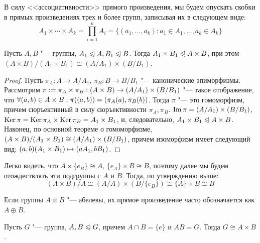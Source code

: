 \begin{note}
	В силу <<ассоциативности>> прямого произведения, мы будем опускать скобки в прямых произведениях трех и более групп, записывая их в следующем виде:
	\[A_1 \times \dotsb \times A_k = \prod_{i = 1}^kA_i = \{(a_1, \dotsc, a_k): a_1 \in A_1, \dotsc, a_k \in A_k\}\]
\end{note}

\begin{proposition}
	Пусть $A, B$ "--- группы, $A_1 \trianglelefteqslant A, B_1 \trianglelefteqslant B$. Тогда $A_1 \times B_1 \trianglelefteqslant A \times B$, при этом $(A \times B) / (A_1 \times B_1) \cong (A / A_1) \times (B / B_1)$.
\end{proposition}

\begin{proof}
	Пусть $\pi_A: A \to A/A_1$, $\pi_B: B \to B/B_1$ "--- канонические эпиморфизмы. Рассмотрим $\pi := \pi_A \times \pi_B: (A \times B) \hm\to (A / A_1) \times (B / B_1)$ "--- такое отображение, что $\forall (a, b) \hm\in A \times B: \pi((a, b)) = (\pi_A(a), \pi_B(b))$. Тогда $\pi$ "--- это гомоморфизм, причем сюръективный в силу сюръективности $\pi_A, \pi_B$. $\operatorname{Im}\pi = (A / A_1) \times (B / B_1)$, $\ke\pi \hm= \ke\pi_A \times \ke\pi_B = A_1 \times B_1$, и, следовательно, $A_1 \times B_1 \hm\normal A \times B$. Наконец, по основной теореме о гомоморфизме, $(A \times B) / (A_1 \hm\times B_1) \hm\cong (A / A_1) \times (B / B_1)$, причем изоморфизм имеет следующий вид: $(a, b)(A_1 \times B_1) \hm\mapsto (aA_1, bB_1)$.
\end{proof}

\begin{note}
	Легко видеть, что $A \times \{e_B\} \cong A$, $\{e_A\} \times B \cong B$, поэтому далее мы будем отождествлять эти подгруппы с $A$ и $B$. Тогда, по утверждению выше:
	\[(A \times B)/A \cong (A / A) \times (B / \{e_B\}) \cong \{A\} \times B \cong B\]
\end{note}

\begin{note}
	Если группы $A$ и $B$ "--- абелевы, их прямое произведение часто обозначается как $A \oplus B$.
\end{note}

\begin{theorem}
	Пусть $G$ "--- группа, $A, B \trianglelefteqslant G$, причем $A \cap B = \{e\}$ и $AB = G$. Тогда $G \cong A \times B$.
\end{theorem}

